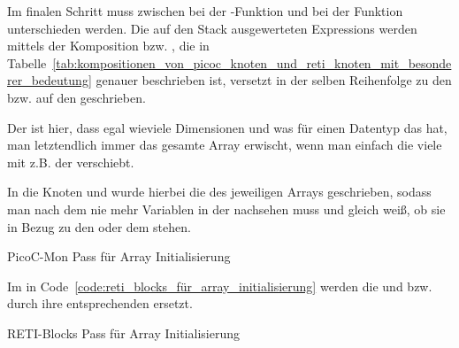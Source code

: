 Im finalen Schritt muss zwischen  bei der -Funktion und  bei der Funktion  unterschieden werden. Die auf den Stack ausgewerteten Expressions werden mittels der Komposition  bzw. , die in Tabelle~\ref{tab:kompositionen_von_picoc_knoten_und_reti_knoten_mit_besonderer_bedeutung} genauer beschrieben ist, versetzt in der selben Reihenfolge zu den  bzw. auf den  geschrieben.

Der  ist hier, dass egal wieviele Dimensionen und was für einen Datentyp das  hat, man letztendlich immer das gesamte Array erwischt, wenn man einfach die  viele  mit z.B. der   verschiebt.

In die Knoten  und   wurde hierbei die  des jeweiligen Arrays geschrieben, sodass man nach dem  nie mehr Variablen in der   nachsehen muss und gleich weiß, ob sie in Bezug zu den  oder dem  stehen.

\begin{code}
  \centering
  \caption{PicoC-Mon Pass für Array Initialisierung}
  \label{code:picoc_mon_für_array_initialisierung}
\end{code}

Im  in Code~\ref{code:reti_blocks_für_array_initialisierung} werden die   und  bzw.  durch ihre entsprechenden  ersetzt.

\begin{code}
  \centering
  \caption{RETI-Blocks Pass für Array Initialisierung}
  \label{code:reti_blocks_für_array_initialisierung}
\end{code}


